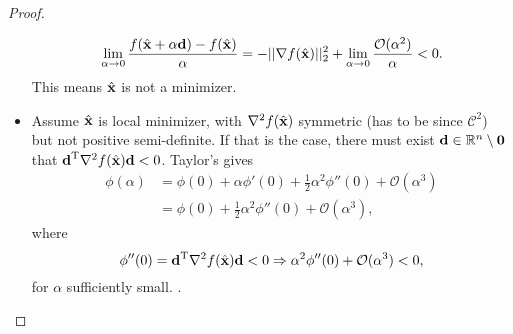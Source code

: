 \documentclass{article}
\begin{document}
\begin{proof}
\begin{itemize}
        \begin{equation}
            \lim_{\alpha\rightarrow0}\frac{ f(\hat{\bm{\mathrm{x}}}+\alpha\bm{\mathrm{d}})-f(\hat{\bm{\mathrm{x}}})}{\alpha}=- ||\nabla f(\hat{\bm{\mathrm{x}}})||_2^2 +\lim_{\alpha\rightarrow0}\frac{\mathcal{O}(\alpha^2)}{\alpha}<0.
        \end{equation}
        This means $\hat{\bm{\mathrm{x}}}$ is not a minimizer.
        \item Assume $\hat{\bm{\mathrm{x}}}$ is local minimizer, with $\nabla^2 f(\hat{\bm{\mathrm{x}}})$ symmetric (has to be since $\mathcal{C}^2$) but not positive semi-definite. If that is the case, there must exist $\bm{\mathrm{d}}\in\mathbb{R}^n\setminus\bm{\mathrm{0}}$ that $\bm{\mathrm{d}}^{\text{T}}\nabla^2 f(\hat{\bm{\mathrm{x}}})\bm{\mathrm{d}}<0$. Taylor's gives
        \begin{align}
            \phi(\alpha)&=\phi(0)+\alpha\phi'(0) +\frac{1}{2}\alpha^2\phi''(0) + \mathcal{O}(\alpha^3)\\
            &=\phi(0)+\frac{1}{2}\alpha^2\phi''(0) + \mathcal{O}(\alpha^3),
        \end{align}
        where
        \begin{equation}
            \phi''(0)=\bm{\mathrm{d}}^{\text{T}}\nabla^2 f(\hat{\bm{\mathrm{x}}})\bm{\mathrm{d}}<0\Rightarrow\alpha^2\phi''(0)+\mathcal{O}(\alpha^3)<0,
        \end{equation}
        for $\alpha$ sufficiently small.
.    \end{itemize}
\end{proof}
\end{document}
